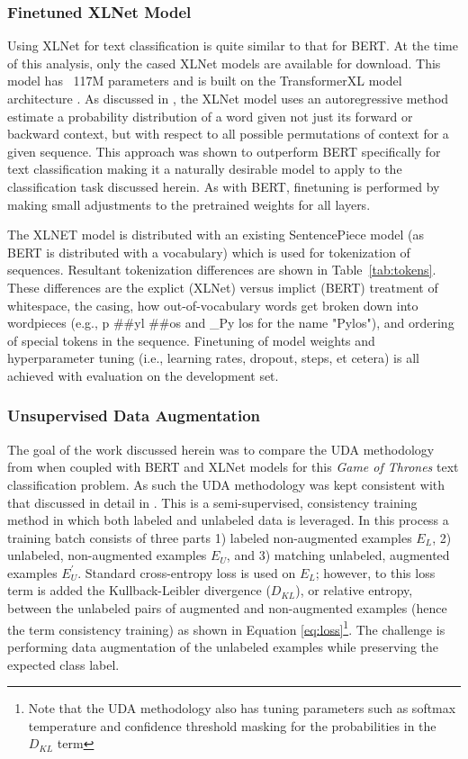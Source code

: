 \documentclass[twoside,twocolumn,10pt]{article}
\begin{document}
\subsubsection{Finetuned XLNet Model}
Using XLNet for text classification is quite similar to that for BERT. At the time of this analysis, only the cased XLNet models are available for download. This model has ~117M parameters and is built on the TransformerXL model architecture \cite{Dai:2019}. As discussed in \cite{Yang:2019}, the XLNet model uses an autoregressive method estimate a probability distribution of a word given not just its forward or backward context, but with respect to all possible permutations of context for a given sequence. This approach was shown to outperform BERT specifically for text classification making it a naturally desirable model to apply to the classification task discussed herein. As with BERT, finetuning is performed by making small adjustments to the pretrained weights for all layers.

 The XLNET model is distributed with an existing SentencePiece model (as BERT is distributed with a vocabulary) which is used for tokenization of sequences. Resultant tokenization differences are shown in Table~\ref{tab:tokens}. These differences are the explict (XLNet) versus implict (BERT) treatment of whitespace, the casing, how out-of-vocabulary words get broken down into wordpieces (e.g., p \#\#yl \#\#os and \_Py los for the name "Pylos"), and ordering of special tokens in the sequence. Finetuning of model weights and hyperparameter tuning (i.e., learning rates, dropout, steps, et cetera) is all achieved with evaluation on the development set. 
 
\subsubsection{Unsupervised Data Augmentation}
The goal of the work discussed herein was to compare the UDA methodology from \cite{Xie:2019} when coupled with BERT and XLNet models for this {\it Game of Thrones} text classification problem. As such the UDA methodology was kept consistent with that discussed in detail in \cite{Xie:2019}. This is a semi-supervised, consistency training method in which both labeled and unlabeled data is leveraged. In this process a training batch consists of three parts 1) labeled non-augmented examples $E_{L}$, 2) unlabeled, non-augmented examples $E_{U}$, and 3) matching unlabeled, augmented examples $E^{\prime}_{U}$. Standard cross-entropy loss is used on $E_{L}$; however, to this loss term is added the Kullback-Leibler divergence ($D_{KL}$), or relative entropy, between the unlabeled pairs of augmented and non-augmented examples (hence the term consistency training) as shown in Equation \ref{eq:loss}\footnote{Note that the UDA methodology also has tuning parameters such as softmax temperature and confidence threshold masking for the probabilities in the $D_{KL}$ term}. The challenge is performing data augmentation of the unlabeled examples while preserving the expected class label.
\end{document}
